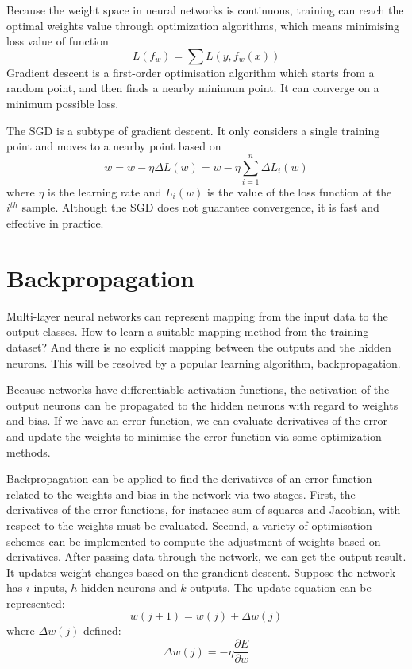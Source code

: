 Because the weight space in neural networks is continuous, training can reach the optimal weights value through optimization algorithms, which means minimising loss value of function
\begin{equation}\label{eq:LossMin}
L(f_{w}) = \sum L(y, f_{w}(x))
\end{equation}
Gradient descent is a first-order optimisation algorithm which starts from a random point, and then finds a nearby minimum point. It can converge on a minimum possible loss.

The SGD is a subtype of gradient descent. It only considers a single training point and moves to a nearby point based on
\begin{equation}\label{eq:SGDUpdate}
w = w - \eta  \Delta L(w) = w - \eta \sum_{i=1}^{n} \Delta L_{i}(w)
\end{equation}
where $\eta$ is the learning rate and $L_{i}(w)$ is the value of the loss function at the $i^{th}$ sample. Although the SGD does not guarantee convergence, it is fast and effective in practice.

\section{Backpropagation}

Multi-layer neural networks can represent mapping from the input data to the output classes. How to learn a suitable mapping method from the training dataset? And there is no explicit mapping between the outputs and the hidden neurons. This will be resolved by a popular learning algorithm, backpropagation.

Because networks have differentiable activation functions, the activation of the output neurons can be propagated to the hidden neurons with regard to weights and bias. If we have an error function, we can evaluate derivatives of the error and update the weights to minimise the error function via some optimization methods.

Backpropagation can be applied to find the derivatives of an error function related to the weights and bias in the network via two stages. First, the derivatives of the error functions, for instance sum-of-squares and Jacobian, with respect to the weights must be evaluated. Second, a variety of optimisation schemes can be implemented to compute the adjustment of weights based on derivatives. After passing data through the network, we can get the output result. It updates weight changes based on the grandient descent. Suppose the network has $i$ inputs, $h$ hidden neurons and $k$ outputs. The update equation can be represented: 
\begin{equation}\label{eq:UpdateWeights}
w(j+1) = w(j) + \Delta w(j)
\end{equation}
where $\Delta w(j)$ defined: 
\begin{equation}\label{eq:DeltaWeights}
\Delta w(j) = -\eta \frac{\partial E}{\partial w}
\end{equation}

